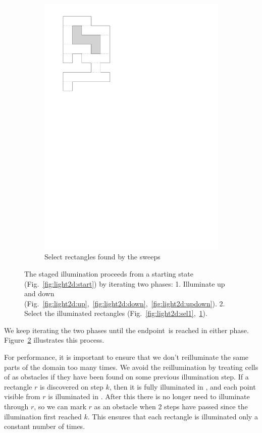 \documentclass[english,gradu]{tktltiki2018}
\begin{document}
\begin{figure}
\begin{subfigure}[t]{0.15\textwidth}
		\includegraphics[width=\textwidth,page=7]{fig/light2d}
		\caption{Select rectangles found by the sweeps}\label{fig:light2d:sel2}
	\end{subfigure}
	\caption{The staged illumination proceeds from a starting state (Fig.~\ref{fig:light2d:start}) by iterating two phases:
	1. Illuminate up and down (Fig.~\ref{fig:light2d:up},~\ref{fig:light2d:down},~\ref{fig:light2d:updown}).
	2. Select the illuminated rectangles (Fig.~\ref{fig:light2d:sel1},~\ref{fig:light2d:sel2}).
	}\label{fig:light2d}
\end{figure}

We keep iterating the two phases until the endpoint~\ept is reached in either phase.
Figure~\ref{fig:light2d} illustrates this process.

For performance, it is important to ensure that we don't reilluminate the same parts of the domain too many times.
We avoid the reillumination by treating cells of  as obstacles if they have been found on some previous illumination step.
If a rectangle $r$ is discovered on step $k$, then it is fully illuminated in , and each point visible from $r$ is illuminated in .
After this there is no longer need to illuminate through $r$, so we can mark $r$ as an obstacle when 2 steps have passed since the illumination first reached $k$.
This ensures that each rectangle is illuminated only a constant number of times.
\end{document}

